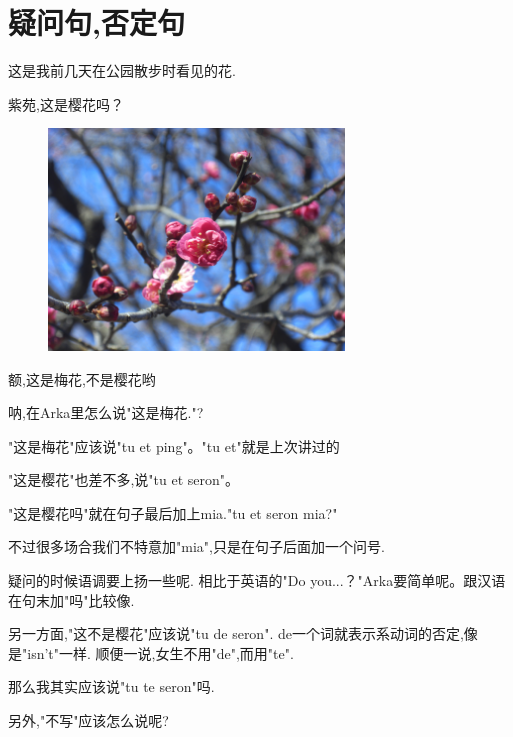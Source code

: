 \chapter[疑问句,否定句]{疑问句,否定句}

  



这是我前几天在公园散步时看见的花.

紫苑,这是樱花吗？
\begin{figure}[H]
\includegraphics[width=0.7\textwidth]{ARKA/ping.jpg}
\end{figure}

额,这是梅花,不是樱花哟

呐,在Arka里怎么说"这是梅花."?

"这是梅花"应该说"tu et ping"。"tu et"就是上次讲过的

"这是樱花"也差不多,说"tu et seron"。

"这是樱花吗"就在句子最后加上mia."tu et seron mia?"

不过很多场合我们不特意加"mia",只是在句子后面加一个问号.


疑问的时候语调要上扬一些呢.
相比于英语的"Do you...？"Arka要简单呢。跟汉语在句末加"吗"比较像.


另一方面,"这不是樱花"应该说"tu de seron".
de一个词就表示系动词的否定,像是"isn't"一样.
顺便一说,女生不用"de",而用"te".


那么我其实应该说"tu te seron"吗.

另外,"不写"应该怎么说呢?


